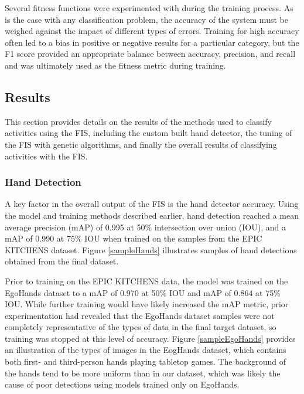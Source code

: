 \documentclass[12pt]{report}
\begin{document}
Several fitness functions were experimented with during the training process. As is the case with any classification problem, the accuracy of the system must be weighed against the impact of different types of errors. Training for high accuracy often led to a bias in positive or negative results for a particular category, but the F1 score provided an appropriate balance between accuracy, precision, and recall and was ultimately used as the fitness metric during training.

\subsection{Results}
This section provides details on the results of the methods used to classify activities using the FIS, including the custom built hand detector, the tuning of the FIS with genetic algorithms, and finally the overall results of classifying activities with the FIS.

\subsubsection{Hand Detection}
A key factor in the overall output of the FIS is the hand detector accuracy. Using the model and training methods described earlier, hand detection reached a mean average precision (mAP) of 0.995 at 50\% intersection over union (IOU), and a mAP of 0.990 at 75\% IOU when trained on the samples from the EPIC KITCHENS dataset. Figure \ref{sampleHands} illustrates samples of hand detections obtained from the final dataset.

Prior to training on the EPIC KITCHENS data, the model was trained on the EgoHands dataset to a mAP of 0.970 at 50\% IOU and mAP of 0.864 at 75\% IOU. While further training would have likely increased the mAP metric, prior experimentation had revealed that the EgoHands dataset samples were not completely representative of the types of data in the final target dataset, so training was stopped at this level of accuracy. Figure \ref{sampleEgoHands} provides an illustration of the types of images in the EogHands dataset, which contains both first- and third-person hands playing tabletop games. The background of the hands tend to be more uniform than in our dataset, which was likely the cause of poor detections using models trained only on EgoHands.
\end{document}
